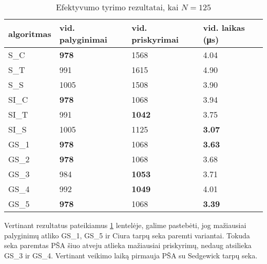 \documentclass{VUMIFInfKursinis}
\begin{document}
\begin{table}[H]
  \caption{Efektyvumo tyrimo rezultatai, kai $N = 125$}
  \label{results_125}
  \centering
  \begin{tabular}{@{}llll@{}}
  algoritmas & vid. palyginimai                     & vid. priskyrimai                      & vid. laikas (μs)                      \\ \midrule
  S\_C       & \cellcolor[HTML]{70AD47}\textbf{978} & 1568                                  & 4.04                                  \\
  S\_T       & 991                                  & 1615                                  & 4.90                                  \\
  S\_S       & 1005                                 & 1508                                  & 3.90                                  \\
  SI\_C      & \cellcolor[HTML]{70AD47}\textbf{978} & 1068                                  & 3.94                                  \\
  SI\_T      & 991                                  & \cellcolor[HTML]{70AD47}\textbf{1042} & 3.75                                  \\
  SI\_S      & 1005                                 & 1125                                  & \cellcolor[HTML]{70AD47}\textbf{3.07} \\
  GS\_1      & \cellcolor[HTML]{70AD47}\textbf{978} & 1068                                  & \cellcolor[HTML]{70AD47}\textbf{3.63} \\
  GS\_2      & \cellcolor[HTML]{70AD47}\textbf{978} & 1068                                  & 3.68                                  \\
  GS\_3      & 984                                  & \cellcolor[HTML]{70AD47}\textbf{1053} & 3.71                                  \\
  GS\_4      & 992                                  & \cellcolor[HTML]{70AD47}\textbf{1049} & 4.01                                  \\
  GS\_5      & \cellcolor[HTML]{70AD47}\textbf{978} & 1068                                  & \cellcolor[HTML]{70AD47}\textbf{3.39} \\ \bottomrule
  \end{tabular}
\end{table}

Vertinant rezultatus pateikiamus \ref{results_125} lentelėje, galime pastebėti, jog
mažiausiai palyginimų atliko GS\_1, GS\_5 ir Ciura tarpų seka paremti variantai.
Tokuda seka paremtas PŠA šiuo atveju atlieka mažiausiai priskyrimų, nedaug atsilieka GS\_3 ir GS\_4.
Vertinant veikimo laiką pirmauja PŠA su Sedgewick tarpų seka.
\end{document}
